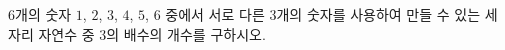 $6$개의 숫자 $1$, $2$, $3$, $4$, $5$, $6$ 중에서 서로 다른 $3$개의 숫자를 사용하여 만들 수 있는 세 자리 자연수 중 $3$의 배수의 개수를 구하시오.
